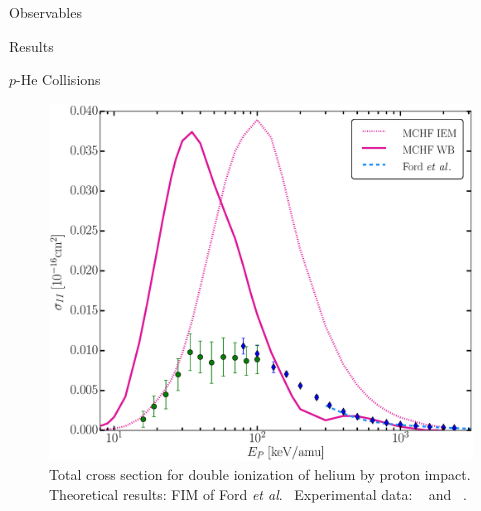 \documentclass[letterpaper, 11 pt]{report}
\begin{document}
\begin{chapter}{Observables \label{chap:p-he2p-he}}
\begin{section}{Results \label{sec:phe2p-res}}
\begin{subsection}{\texorpdfstring{$p$}{p}-He Collisions \label{sec:phe-res}}
\begin{figure}[ht]
\begin{minipage}{.49\linewidth}
               \centering
               \includegraphics[width = \linewidth]{./images/phe/phe-II.eps}
               \caption[Total cross section for double ionization of helium by proton impact.]
                       {Total cross section for double ionization of helium by proton impact.
                        Theoretical results: FIM of Ford \textit{et al}.~\cite{FR-94}
                        Experimental data: {\color{OliveGreen}{$\bullet$}}~\cite{SG89} and
                        {\color{blue}{$\blacklozenge$}}~\cite{SG85}. \label{fig:phe-ii}}

            \end{minipage} \hspace{0.04\linewidth} %
            \begin{minipage}{.49\linewidth}


\end{minipage}
\end{figure}
\end{subsection}
\end{section}
\end{chapter}
\end{document}
